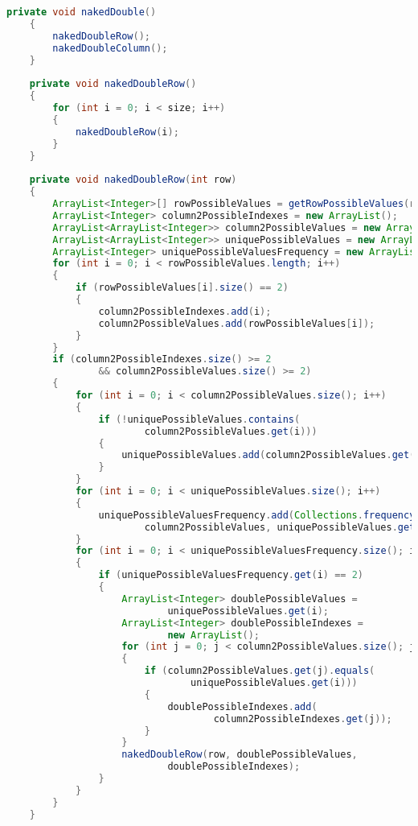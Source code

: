 \begin{lstlisting}[language=Java,basicstyle=\tiny,caption=SolverRuleBased.java]
    private void nakedDouble()
    {
        nakedDoubleRow();
        nakedDoubleColumn();
    }
    
    private void nakedDoubleRow()
    {
        for (int i = 0; i < size; i++)
        {
            nakedDoubleRow(i);
        }
    }
    
    private void nakedDoubleRow(int row)
    {
        ArrayList<Integer>[] rowPossibleValues = getRowPossibleValues(row);
        ArrayList<Integer> column2PossibleIndexes = new ArrayList();
        ArrayList<ArrayList<Integer>> column2PossibleValues = new ArrayList();
        ArrayList<ArrayList<Integer>> uniquePossibleValues = new ArrayList();
        ArrayList<Integer> uniquePossibleValuesFrequency = new ArrayList();
        for (int i = 0; i < rowPossibleValues.length; i++)
        {
            if (rowPossibleValues[i].size() == 2)
            {
                column2PossibleIndexes.add(i);
                column2PossibleValues.add(rowPossibleValues[i]);
            }
        }
        if (column2PossibleIndexes.size() >= 2
                && column2PossibleValues.size() >= 2)
        {
            for (int i = 0; i < column2PossibleValues.size(); i++)
            {
                if (!uniquePossibleValues.contains(
                        column2PossibleValues.get(i)))
                {
                    uniquePossibleValues.add(column2PossibleValues.get(i));
                }
            }
            for (int i = 0; i < uniquePossibleValues.size(); i++)
            {
                uniquePossibleValuesFrequency.add(Collections.frequency(
                        column2PossibleValues, uniquePossibleValues.get(i)));
            }
            for (int i = 0; i < uniquePossibleValuesFrequency.size(); i++)
            {
                if (uniquePossibleValuesFrequency.get(i) == 2)
                {
                    ArrayList<Integer> doublePossibleValues = 
                            uniquePossibleValues.get(i);
                    ArrayList<Integer> doublePossibleIndexes = 
                            new ArrayList();
                    for (int j = 0; j < column2PossibleValues.size(); j++)
                    {
                        if (column2PossibleValues.get(j).equals(
                                uniquePossibleValues.get(i)))
                        {
                            doublePossibleIndexes.add(
                                    column2PossibleIndexes.get(j));
                        }
                    }
                    nakedDoubleRow(row, doublePossibleValues, 
                            doublePossibleIndexes);
                }
            }
        }
    }
    

\end{lstlisting}
